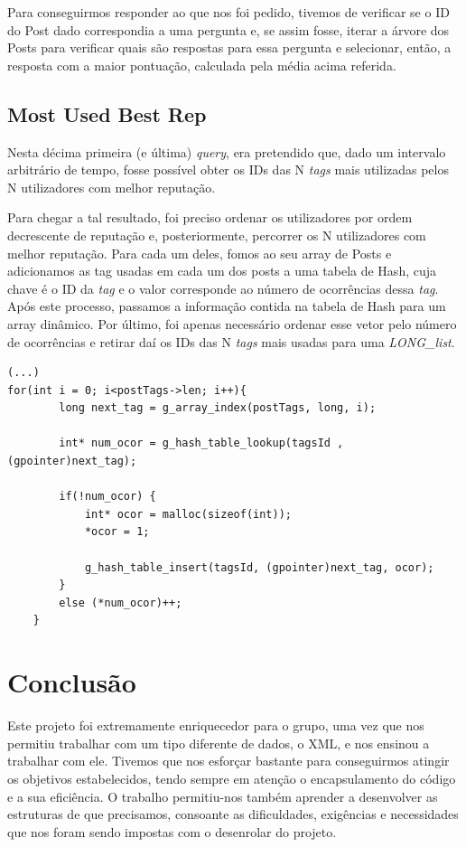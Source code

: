 \documentclass[a4paper, 11pt, oneside]{article}
\begin{document}
Para conseguirmos responder ao que nos foi pedido, tivemos de verificar se o ID do Post dado correspondia a uma pergunta e, se assim fosse, iterar a árvore dos Posts para verificar quais são respostas para essa pergunta e selecionar, então, a resposta com a maior pontuação, calculada pela média acima referida.

\subsection{Most Used Best Rep}
Nesta décima primeira (e última) \textit{query}, era pretendido que, dado um intervalo arbitrário de tempo, fosse possível obter os IDs das N \textit{tags} mais utilizadas pelos N utilizadores com melhor reputação.

Para chegar a tal resultado, foi preciso ordenar os utilizadores por ordem decrescente de reputação e, posteriormente, percorrer os N utilizadores com melhor reputação. Para cada um deles, fomos ao seu array de Posts e adicionamos as tag usadas em cada um dos posts a uma tabela de Hash, cuja chave é o ID da \textit{tag} e o valor corresponde ao número de ocorrências dessa \textit{tag}. Após este processo, passamos a informação contida na tabela de Hash para um array dinâmico. Por último, foi apenas necessário ordenar esse vetor pelo número de ocorrências e retirar daí os IDs das N \textit{tags} mais usadas para uma \textit{LONG\_list}.

\begin{lstlisting}[caption=Query 11 - registo da ocorrência de uma \textit{tag} na tabela de Hash]
(...)
for(int i = 0; i<postTags->len; i++){
		long next_tag = g_array_index(postTags, long, i);

		int* num_ocor =	g_hash_table_lookup(tagsId , (gpointer)next_tag);

		if(!num_ocor) {
			int* ocor = malloc(sizeof(int));
			*ocor = 1;

			g_hash_table_insert(tagsId, (gpointer)next_tag, ocor);
		}
		else (*num_ocor)++; 
	}

\end{lstlisting}

\section{Conclusão}
Este projeto foi extremamente enriquecedor para o grupo, uma vez que nos permitiu trabalhar com um tipo diferente de dados, o XML, e nos ensinou a trabalhar com ele. Tivemos que nos esforçar bastante para conseguirmos atingir os objetivos estabelecidos, tendo sempre em atenção o encapsulamento do código e a sua eficiência. O trabalho permitiu-nos também aprender a desenvolver as estruturas de que precisamos, consoante as dificuldades, exigências e necessidades
que nos foram sendo impostas com o desenrolar do projeto.
\end{document}
